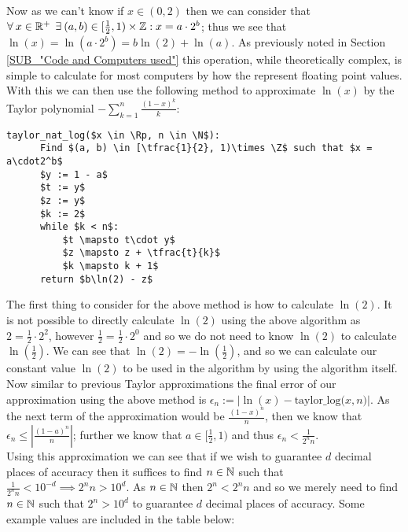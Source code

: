 Now as we can't know if \(x \in (0,2)\) then we can consider that \(\forall\: x \in \mathbb{R}^+\:\: \exists\: (a, b) \in [\frac{1}{2}, 1)\times\mathbb{Z} : x = a\cdot2^b\); thus we see that \(\ln(x) = \ln(a\cdot2^b) = b\ln(2) + \ln(a)\). As previously noted in Section \ref{SUB_"Code and Computers used"} this operation, while theoretically complex, is simple to calculate for most computers by how the represent floating point values.\\

With this we can then use the following method to approximate \(\ln(x)\) by the Taylor polynomial \(-\sum_{k=1}^n\frac{(1-x)^k}{k}\):

\begin{lstlisting}[caption={Taylor Method for calculating \(\ln(x)\)},label={PCD_"taylor log"}]
  taylor_nat_log($x \in \Rp, n \in \N$):
      Find $(a, b) \in [\tfrac{1}{2}, 1)\times \Z$ such that $x = a\cdot2^b$
      $y := 1 - a$
      $t := y$
      $z := y$
      $k := 2$
      while $k < n$:
          $t \mapsto t\cdot y$
          $z \mapsto z + \tfrac{t}{k}$
          $k \mapsto k + 1$
      return $b\ln(2) - z$
\end{lstlisting}

The first thing to consider for the above method is how to calculate \(\ln(2)\). It is not possible to directly calculate \(\ln(2)\) using the above algorithm as \(2 = \frac{1}{2}\cdot2^2\), however \(\frac{1}{2} = \frac{1}{2}\cdot2^0\) and so we do not need to know \(\ln(2)\) to calculate \(\ln(\frac{1}{2})\). We can see that \(\ln(2) = -\ln(\frac{1}{2})\), and so we can calculate our constant value \(\ln(2)\) to be used in the algorithm by using the algorithm itself.\\

Now similar to previous Taylor approximations the final error of our approximation using the above method is \(\epsilon_n := |\ln(x) - \textrm{taylor\_log(}x,n\textrm{)}|\). As the next term of the approximation would be \(\tfrac{(1-x)^n}{n}\), then we know that \(\epsilon_n \le \left|\tfrac{(1-a)^n}{n}\right|\); further we know that \(a \in [\tfrac{1}{2}, 1)\) and thus \(\epsilon_n < \tfrac{1}{2^nn}\).\\

Using this approximation we can see that if we wish to guarantee \(d\) decimal places of accuracy then it suffices to find \(n \in \mathbb{N}\) such that \(\tfrac{1}{2^nn} < 10^{-d} \implies 2^nn > 10^d\). As \(n \in \mathbb{N}\) then \(2^n < 2^nn\) and so we merely need to find \(n \in \mathbb{N}\) such that \(2^n > 10^d\) to guarantee \(d\) decimal places of accuracy. Some example values are included in the table below:\\

